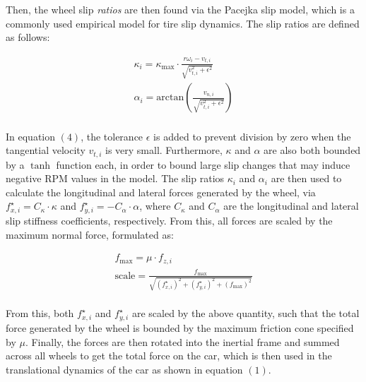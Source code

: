 Then, the wheel slip \textit{ratios} are then found via the Pacejka slip model, which is a commonly used empirical model for tire slip dynamics. The slip ratios are defined as follows:

\begin{equation}
  \begin{gathered}
    \kappa_i = \kappa_\mathrm{max} \cdot \frac{r\omega_i - v_{t,i}}{\sqrt{v_{t,i}^2+\epsilon^2}} \\
    \alpha_i = \mathrm{arctan}\left(\frac{v_{n,i}}{\sqrt{v_{t,i}^2+\epsilon^2}}\right) \\
  \end{gathered}
\end{equation}

In equation $(4)$, the tolerance $\epsilon$ is added to prevent division by zero when the tangential velocity $v_{t,i}$ is very small. Furthermore, $\kappa$ and $\alpha$ are also both bounded by a $\tanh$ function each, in order to bound large slip changes that may induce negative RPM values in the model. The slip ratios $\kappa_i$ and $\alpha_i$ are then used to calculate the longitudinal and lateral forces generated by the wheel, via $f_{x,i}^\star=C_\kappa \cdot \kappa$ and $f_{y,i}^\star=-C_\alpha \cdot \alpha$, where $C_\kappa$ and $C_\alpha$ are the longitudinal and lateral slip stiffness coefficients, respectively. From this, all forces are scaled by the maximum normal force, formulated as:

\begin{equation}
  \begin{gathered}
    f_\mathrm{max} = \mu \cdot f_{z,i} \\
    \mathrm{scale} = \frac{f_\mathrm{max}}{\sqrt{\left(f_{x,i}^\star\right)^2+\left(f_{y,i}^\star\right)^2 + \left(f_\mathrm{max}\right)^2}} \\
  \end{gathered}
\end{equation}

From this, both $f_{x,i}^\star$ and $f_{y,i}^\star$ are scaled by the above quantity, such that the total force generated by the wheel is bounded by the maximum friction cone specified by $\mu$. Finally, the forces are then rotated into the inertial frame and summed across all wheels to get the total force on the car, which is then used in the translational dynamics of the car as shown in equation $(1)$.


